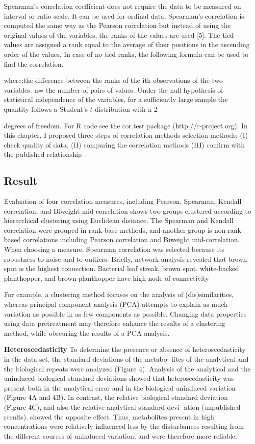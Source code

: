 {Spearman’s correlation coefficient does not require the data to be measured on interval or ratio scale. It can be used for ordinal data. Spearman’s correlation is computed the same way as the Pearson correlation but instead of using the original values of the variables, the ranks of the values are used [5]. The tied values are assigned a rank equal to the average of their positions in the ascending order of the values. In case of no tied ranks, the following formula can be used to find the correlation.

where;the difference between the ranks of the ith observations of the two variables. n= the number of pairs of values.
Under the null hypothesis of statistical independence of the variables, for a sufficiently large sample the quantity
follows a Student’s $t$-distribution with n-2

degrees of freedom. For R code see the cor.test package (http://r-project.org).
In this chapter, I proposed three steps of correlation methods selection methods: (I) check quality of data, (II) comparing  the correlation methods (III) confirm with the published relationship .


\subsection{Result}
Evaluation of four correlation measures, including Pearson, Spearman, Kendall correlation, and Biweight mid-correlation shows two groups clustered according to hierarchical clustering using Euclidean distance. The Spearman and Kendall correlation were grouped in rank-base methods, and another group is non-rank-based correlations including Pearson correlation and Biweight mid-correlation. When choosing a measure, Spearman correlation was selected because its robustness to noise and to outliers.
Briefly, network analysis revealed that brown spot is the highest connection. Bacterial leaf streak, brown spot, white-backed planthopper, and brown planthopper have high node of connectivity

For example, a clustering method focuses on the analysis of (dis)similarities, whereas principal component analysis (PCA) attempts to explain as much variation as possible in as few components as possible. Changing data properties using data pretreatment may therefore enhance the results of a clustering method, while obscuring the results of a PCA analysis.

\textbf{Heteroscedasticity}
To determine the presence or absence of heteroscedasticity in the data set, the standard deviations of the metabo- lites of the analytical and the biological repeats were analyzed (Figure 4). Analysis of the analytical and the uninduced biological standard deviations showed that heteroscedasticity was present both in the analytical error and in the biological uninduced variation (Figure 4A and 4B). In contrast, the relative biological standard deviation (Figure 4C), and also the relative analytical standard devi- ation (unpublished results), showed the opposite effect. Thus, metabolites present in high concentrations were relatively influenced less by the disturbances resulting from the different sources of uninduced variation, and were therefore more reliable.

}
